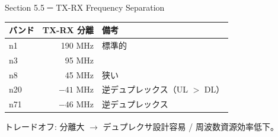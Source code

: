 \begin{frame}{Section 5.5 ─ TX-RX Frequency Separation}
\centering
\begin{tabular}{lrl}
\toprule
バンド & TX-RX 分離 & 備考 \\
\midrule
n1  & 190 MHz & 標準的 \\
n3  &  95 MHz &  \\
n8  &  45 MHz & 狭い \\
n20 & $-41$ MHz & 逆デュプレックス（UL $>$ DL） \\
n71 & $-46$ MHz & 逆デュプレックス \\
\bottomrule
\end{tabular}

\vspace{0.6em}
{\small トレードオフ: 分離大 $\to$ デュプレクサ設計容易 / 周波数資源効率低下。}
\end{frame}

